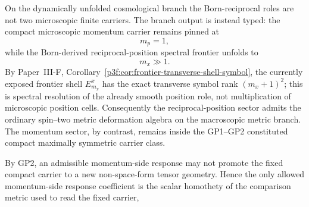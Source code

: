 \documentclass[12pt,a4paper]{article}
\begin{document}
\begin{theorem}
\label{p8:thm:momentum-carrier-rigidity-scalar-trace}
On the dynamically unfolded cosmological branch the Born-reciprocal roles are
not two microscopic finite carriers.  The branch output is instead typed: the
compact microscopic momentum carrier remains pinned at
\[
    m_p=1,
\]
while the Born-derived reciprocal-position spectral frontier unfolds to
\[
    m_x\gg 1 .
\]
By Paper~III-F, Corollary~\ref{p3f:cor:frontier-transverse-shell-symbol}, the
currently exposed frontier shell $E_{m_x}^x$ has the exact transverse symbol
rank $(m_x+1)^2$; this is spectral resolution of the already smooth position
role, not multiplication of microscopic position cells.  Consequently the
reciprocal-position sector admits the ordinary spin--two metric deformation
algebra on the macroscopic metric branch.  The momentum sector, by contrast, remains inside the
GP1--GP2 constituted compact maximally symmetric carrier class.

By GP2, an admissible momentum-side response may not promote the fixed compact
carrier to a new non-space-form tensor geometry.  Hence the only allowed
momentum-side response coefficient is the scalar homothety of the comparison
metric used to read the fixed carrier,


\end{theorem}
\end{document}
